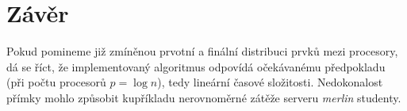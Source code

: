 \documentclass[12pt]{article}
\begin{document}
\vspace{15cm}
\section{Závěr}
Pokud pomineme již zmíněnou prvotní a finální distribuci prvků mezi procesory, dá se říct, že implementovaný algoritmus odpovídá očekávanému předpokladu (při počtu procesorů $p = \log n$), tedy lineární časové složitosti. Nedokonalost přímky mohlo způsobit kupříkladu nerovnoměrné zátěže serveru \textit{merlin} studenty. 
\end{document}
